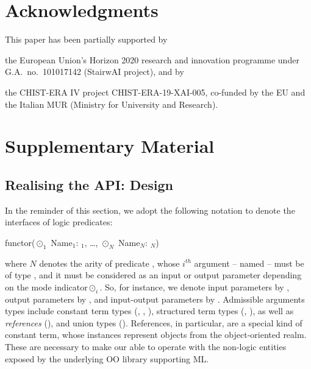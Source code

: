 \documentclass[
]{ceurart}
\begin{document}
\section*{Acknowledgments}
This paper has been partially supported by
%
\begin{inlinelist}
    \item the European Union's Horizon 2020 research and innovation programme under G.A.\ no.\ 101017142 (StairwAI project), and by
    \item the CHIST-ERA IV project CHIST-ERA-19-XAI-005, co-funded by the EU and the Italian MUR (Ministry for University and Research).
\end{inlinelist}



\newpage

\appendix

\section{Supplementary Material}

\subsection{Realising the API: \mllib{} Design}
\label{sec:project}

%
In the reminder of this section, we adopt the following notation to denote the interfaces of logic predicates:
%
\begin{lp}
    functor($\odot_1$ Name$_1$: $_1$, \ldots, $\odot_N$ Name$_N$: $_N$)
\end{lp}
%
where $N$ denotes the arity of predicate , whose $i^{th}$ argument -- named  -- must be of type , and it must be considered as an input or output parameter depending on the mode indicator\footnotemark $\odot_i$.
%
%
So, for instance, we denote input parameters by \pl{+}, output parameters by \pl{-}, and input-output parameters by .
%
Admissible arguments types include constant term types (, , ), structured term types (, ), as well as \emph{references} (), and union types ().
%
References, in particular, are a special kind of constant term, whose instances represent objects from the object-oriented realm.
%
These are necessary to make our \mllib{} able to operate with the non-logic entities exposed by the underlying OO library supporting ML.
\end{document}
